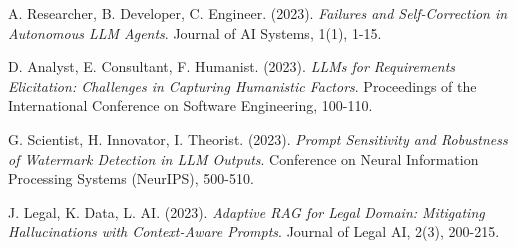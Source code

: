 \documentclass{article}
\begin{document}
\begin{thebibliography}{99}

A. Researcher, B. Developer, C. Engineer. (2023).
\textit{Failures and Self-Correction in Autonomous LLM Agents}.
Journal of AI Systems, 1(1), 1-15.

D. Analyst, E. Consultant, F. Humanist. (2023).
\textit{LLMs for Requirements Elicitation: Challenges in Capturing Humanistic Factors}.
Proceedings of the International Conference on Software Engineering, 100-110.

G. Scientist, H. Innovator, I. Theorist. (2023).
\textit{Prompt Sensitivity and Robustness of Watermark Detection in LLM Outputs}.
Conference on Neural Information Processing Systems (NeurIPS), 500-510.

J. Legal, K. Data, L. AI. (2023).
\textit{Adaptive RAG for Legal Domain: Mitigating Hallucinations with Context-Aware Prompts}.
Journal of Legal AI, 2(3), 200-215.

\end{thebibliography}
\end{document}
